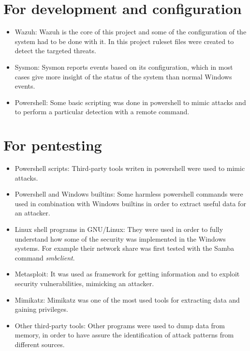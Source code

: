 \section{For development and configuration}
\begin{itemize}
	\item Wazuh: Wazuh\cite{wazuh} is the core of this project and some of the configuration of the system had to be done with it. In this project ruleset files were created to detect the targeted threats.
	\item Sysmon: Sysmon\cite{sysmon} reports events based on its configuration, which in most cases give more insight of the status of the system than normal Windows events.
	\item Powershell: Some basic scripting\cite{memoria_github} was done in powershell to mimic attacks and to perform a particular detection with a remote command.
\end{itemize}

\section{For pentesting}
\begin{itemize}
	\item Powershell scripts: Third-party tools writen in powershell were used to mimic attacks.
	\item Powershell and Windows builtins: Some harmless powershell commands were used in combination with Windows builtins in order to extract useful data for an attacker.
	\item Linux shell programs in GNU/Linux: They were used in order to fully understand how some of the security was implemented in the Windows systems. For example their network share was first tested with the Samba command \textit{smbclient}.
	\item Metasploit: It was used as framework\cite{metasploit} for getting information and to exploit security vulnerabilities, mimicking an attacker.
	\item Mimikatz: Mimikatz\cite{mimikatz_github} was one of the most used tools for extracting data and gaining privileges.
	\item Other third-party tools: Other programs were used to dump data from memory, in order to have assure the identification of attack patterns from different sources.
\end{itemize}

